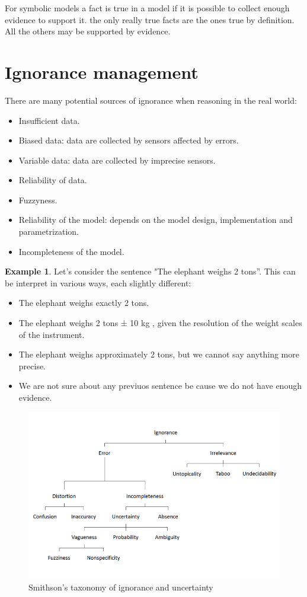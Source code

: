 \documentclass[12pt, a4paper]{report}
\theoremstyle{remark}
\theoremstyle{definition}
\newtheorem{example}{Example}
\begin{document}
    For symbolic models a fact is true in a model if it is possible to collect enough evidence to support it. the only really true facts 
    are the ones true by definition. All the others may be supported by evidence. 
    
    \section{Ignorance management}
    There are many potential sources of ignorance when reasoning in the real world:
    \begin{itemize}
        \item Insufficient data.
        \item Biased data: data are collected by sensors affected by errors. 
        \item Variable data: data are collected by imprecise sensors.
        \item Reliability of data. 
        \item Fuzzyness. 
        \item Reliability of the model: depends on the model design, implementation and parametrization. 
        \item Incompleteness of the model. 
    \end{itemize}
    \begin{example}
        Let’s consider the sentence "The elephant weighs 2 tons”. This can be interpret in various ways, each slightly different:
        \begin{itemize}
            \item The elephant weighs exactly 2 tons.
            \item The elephant weighs 2 tons ± 10 kg , given the resolution of the weight scales of the instrument.
            \item The elephant weighs approximately 2 tons, but we cannot say anything more precise.
            \item We are not sure about any previuos sentence be cause we do not have enough evidence.
        \end{itemize}
    \end{example}
    \begin{figure}[H]
        \centering
        \includegraphics[width=1\linewidth]{images/smithson.png}
        \caption{Smithson's taxonomy of ignorance and uncertainty}
    \end{figure}
\end{document}
